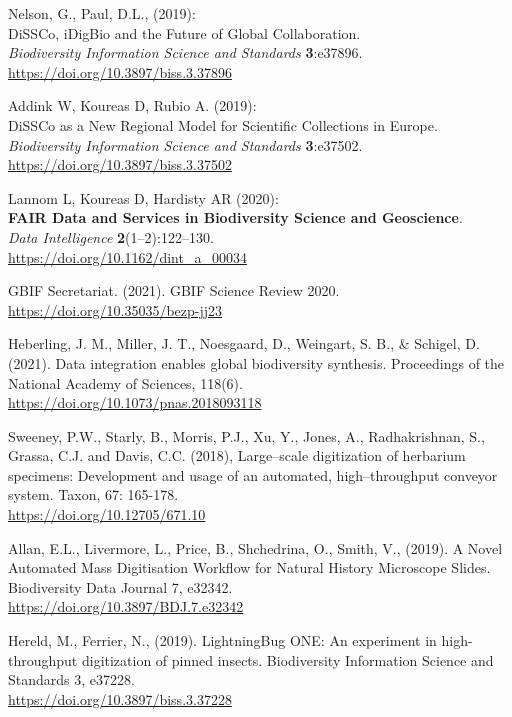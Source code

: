 \begin{thebibliography}{9}
Nelson, G., Paul, D.L., (2019):\\
DiSSCo, iDigBio and the Future of Global Collaboration.\\
\emph{Biodiversity Information Science and Standards}
\textbf{3}:e37896.\\
\url{https://doi.org/10.3897/biss.3.37896}

Addink W, Koureas D, Rubio A. (2019):\\
DiSSCo as a New Regional Model for Scientific Collections in Europe.
\emph{Biodiversity Information Science and Standards}
\textbf{3}:e37502.\\
\url{https://doi.org/10.3897/biss.3.37502}

Lannom L, Koureas D, Hardisty AR (2020):\\
\textbf{FAIR Data and Services in Biodiversity Science and
Geoscience}.\\
\emph{Data Intelligence} \textbf{2}(1--2):122--130.\\
\url{https://doi.org/10.1162/dint_a_00034}

GBIF Secretariat. (2021). GBIF Science Review 2020.\\
\url{https://doi.org/10.35035/bezp-jj23}

Heberling, J. M., Miller, J. T., Noesgaard, D., Weingart, S. B.,
\& Schigel, D. (2021). Data integration enables global biodiversity
synthesis. Proceedings of the National Academy of Sciences, 118(6).\\
\url{https://doi.org/10.1073/pnas.2018093118}

Sweeney, P.W., Starly, B., Morris, P.J., Xu, Y., Jones, A.,
Radhakrishnan, S., Grassa, C.J. and Davis, C.C. (2018), Large--scale
digitization of herbarium specimens: Development and usage of an
automated, high--throughput conveyor system. Taxon, 67: 165-178.\\
\url{https://doi.org/10.12705/671.10}

Allan, E.L., Livermore, L., Price, B., Shchedrina, O., Smith,
V., (2019). A Novel Automated Mass Digitisation Workflow for Natural
History Microscope Slides. Biodiversity Data Journal 7, e32342.\\
\url{https://doi.org/10.3897/BDJ.7.e32342}

Hereld, M., Ferrier, N., (2019). LightningBug ONE: An
experiment in high-throughput digitization of pinned insects.
Biodiversity Information Science and Standards 3, e37228.\\
\url{https://doi.org/10.3897/biss.3.37228}


\end{thebibliography}
